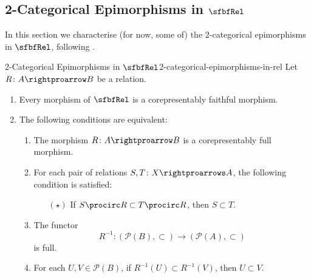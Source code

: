 \subsection{2-Categorical Epimorphisms in $\sfbfRel$}\label{subsection-2-categorical-epimorphisms-in-rel}
In this section we characterise (for now, some of) the $2$-categorical epimorphisms in $\sfbfRel$, following .
\begin{proposition}{2-Categorical Epimorphisms in $\sfbfRel$}{2-categorical-epimorphisms-in-rel}%
    Let $R\colon A\rightproarrow B$ be a relation.
    \begin{enumerate}
        \item\label{2-categorical-epimorphisms-in-rel-corepresentably-faithful-morphisms-in-rel}Every morphism of $\sfbfRel$ is a corepresentably faithful morphism.
        \item\label{2-categorical-epimorphisms-in-rel-corepresentably-full-morphisms-in-rel}The following conditions are equivalent:
            \begin{enumerate}
                \item\label{2-categorical-epimorphisms-in-rel-corepresentably-full-morphisms-in-rel-1}The morphism $R\colon A\rightproarrow B$ is a corepresentably full morphism.
                \item\label{2-categorical-epimorphisms-in-rel-corepresentably-full-morphisms-in-rel-2}For each pair of relations $S,T\colon X\rightproarrows A$, the following condition is satisfied:
                    \begin{itemize}
                        \item[$(\star)$]If $S\procirc R\subset T\procirc R$, then $S\subset T$.
                    \end{itemize}
                \item\label{2-categorical-epimorphisms-in-rel-corepresentably-full-morphisms-in-rel-3}The functor
                    \[
                        R^{-1}%
                        \colon%
                        (\mathcal{P}(B),\subset)%
                        \to%
                        (\mathcal{P}(A),\subset)%
                    \]%
                    is full.
                \item\label{2-categorical-epimorphisms-in-rel-corepresentably-full-morphisms-in-rel-4}For each $U,V\in\mathcal{P}(B)$, if $R^{-1}(U)\subset R^{-1}(V)$, then $U\subset V$.

\end{enumerate}
\end{enumerate}
\end{proposition}
